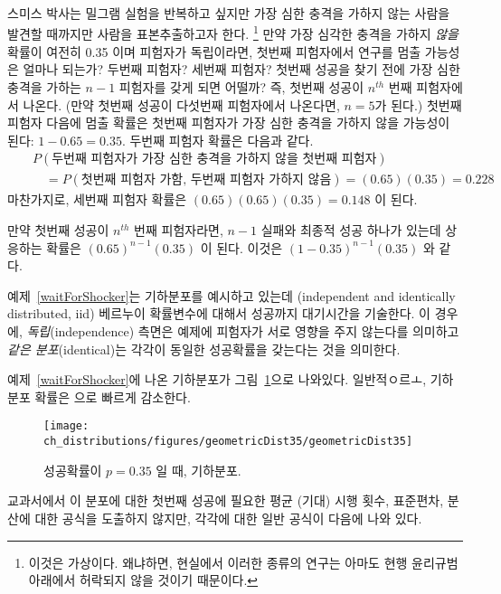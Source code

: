 \begin{example}{스미스 박사는 밀그램 실험을 반복하고 싶지만 가장 심한 충격을 가하지 않는 사람을 발견할 때까지만 사람을 표본추출하고자 한다. \footnote{이것은 가상이다. 왜냐하면, 현실에서 이러한 종류의 연구는 아마도 현행 윤리규범 아래에서 허락되지 않을 것이기 때문이다.}
만약 가장 심각한 충격을 가하지 \emph{않을} 확률이 여전히 0.35 이며 피험자가 독립이라면, 첫번째 피험자에서 연구를 멈출 가능성은 얼마나 되는가? 두번째 피험자? 세번째 피험자? 첫번째 성공을 찾기 전에 가장 심한 충격을 가하는 $n-1$ 피험자를 갖게 되면 어떨까? 즉, 첫번째 성공이 $n^{th}$ 번째 피험자에서 나온다. (만약 첫번째 성공이 다섯번째 피험자에서 나온다면, $n=5$가 된다.)} \label{waitForShocker}
첫번째 피험자 다음에 멈출 확률은 첫번째 피험자가 가장 심한 충격을 가하지 않을 가능성이 된다: $1-0.65=0.35$. 두번째 피험자 확률은 다음과 같다.
\begin{eqnarray*}
&&P(\text{두번째 피험자가 가장 심한 충격을 가하지 않을 첫번째 피험자}) \\
&&\quad = P(\text{첫번째 피험자 가함, 두번째 피험자 가하지 않음}) = (0.65)(0.35) = 0.228
\end{eqnarray*}
마찬가지로, 세번째 피험자 확률은 $(0.65)(0.65)(0.35) = 0.148$ 이 된다.

만약 첫번째 성공이 $n^{th}$ 번째 피험자라면, $n-1$ 실패와 최종적 성공 하나가 있는데 상응하는 확률은 $(0.65)^{n-1}(0.35)$ 이 된다. 이것은 $(1-0.35)^{n-1}(0.35)$ 와 같다.
\end{example}

예제~\ref{waitForShocker}는 기하분포를 예시하고 있는데 (independent and identically distributed, iid) 베르누이 확률변수에 대해서 성공까지 대기시간을 기술한다. 이 경우에, \emph{독립}(independence) 측면은 예제에 피험자가 서로 영향을 주지 않는다를 의미하고 \emph{같은 분포}(identical)는 각각이 동일한 성공확률을 갖는다는 것을 의미한다.

예제~\ref{waitForShocker}에 나온 기하분포가 그림~\ref{geometricDist35}으로 나와있다. 일반적ㅇ르ㅗ, 기하분포 확률은 으로 빠르게 감소한다.

\begin{figure}
\centering
\texttt{[image: ch\_distributions/figures/geometricDist35/geometricDist35]}
\caption{성공확률이 $p=0.35$ 일 때, 기하분포.}
\label{geometricDist35}
\end{figure}

교과서에서 이 분포에 대한 첫번째 성공에 필요한 평균 (기대) 시행 횟수, 표준편차, 분산에 대한 공식을 도출하지 않지만, 각각에 대한 일반 공식이 다음에 나와 있다.


